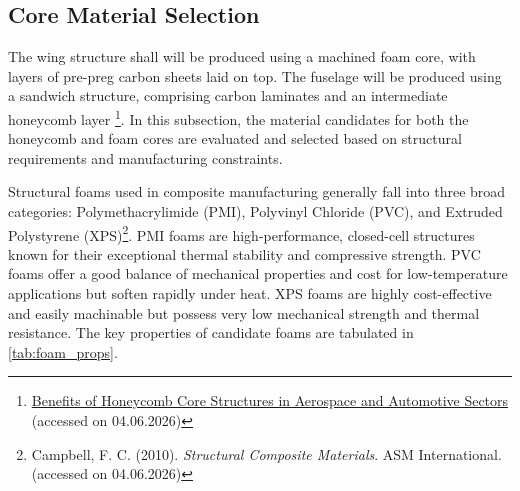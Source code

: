 


\subsection{Core Material Selection}
\label{sub:core_materials}
The wing structure shall will be produced using a machined foam core, with layers of pre-preg carbon sheets laid on top. The fuselage will be produced using a sandwich structure, comprising carbon laminates and an intermediate honeycomb layer \footnote{\href{https://www.dmcrf.com/benefits-of-honeycomb-core-structures-in-aerospace-and-automotive-sectors/}{Benefits of Honeycomb Core Structures in Aerospace and Automotive Sectors} (accessed on 04.06.2026)}. In this subsection, the material candidates for both the honeycomb and foam cores are evaluated and selected based on structural requirements and manufacturing constraints.

Structural foams used in composite manufacturing generally fall into three broad categories: Polymethacrylimide (PMI), Polyvinyl Chloride (PVC), and Extruded Polystyrene (XPS)\footnote{Campbell, F. C. (2010). \textit{Structural Composite Materials}. ASM International. (accessed on 04.06.2026)}. 
PMI foams are high-performance, closed-cell structures known for their exceptional thermal stability and compressive strength. PVC foams offer a good balance of mechanical properties and cost for low-temperature applications but soften rapidly under heat. XPS foams are highly cost-effective and easily machinable but possess very low mechanical strength and thermal resistance. The key properties of candidate foams are tabulated in \autoref{tab:foam_props}.

